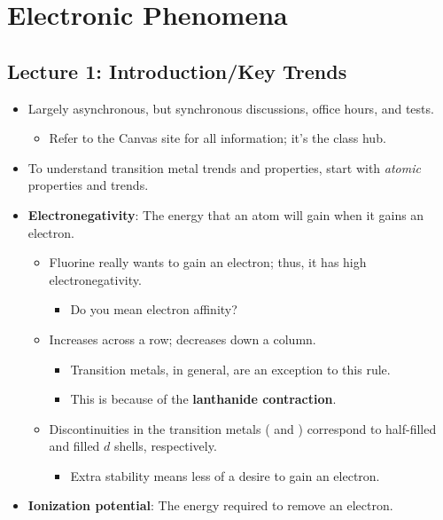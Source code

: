 \documentclass[../notes.tex]{subfiles}
\begin{document}
\chapter{Electronic Phenomena}
\section{Lecture 1: Introduction/Key Trends}
\begin{itemize}
    \item {}Largely asynchronous, but synchronous discussions, office hours, and tests.
    \begin{itemize}
        \item Refer to the Canvas site for all information; it's the class hub.
    \end{itemize}
    \item To understand transition metal trends and properties, start with \emph{atomic} properties and trends.
    \item \textbf{Electronegativity}: The energy that an atom will gain when it gains an electron.
    \begin{itemize}
        \item Fluorine really wants to gain an electron; thus, it has high electronegativity.
        \begin{itemize}
            \item Do you mean electron affinity?
        \end{itemize}
        \item Increases across a row; decreases down a column.
        \begin{itemize}
            \item Transition metals, in general, are an exception to this rule.
            \item This is because of the \textbf{lanthanide contraction}.
        \end{itemize}
        \item Discontinuities in the transition metals ( and ) correspond to half-filled and filled $d$ shells, respectively.
        \begin{itemize}
            \item Extra stability means less of a desire to gain an electron.
        \end{itemize}
    \end{itemize}
    \item \textbf{Ionization potential}: The energy required to remove an electron.

\end{itemize}
\end{document}
